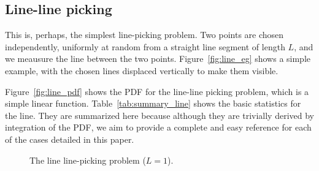 \subsection{Line-line picking}
\label{sec:line_line}

This is, perhaps, the simplest line-picking problem. Two points are
chosen independently, uniformly at random from a straight line segment
of length $L$, and we meausure the line between the two
points. Figure~\ref{fig:line_eg} shows a simple example, with the
chosen lines displaced vertically to make them visible.

Figure~\ref{fig:line_pdf} shows the PDF for the line-line
picking problem, which is a simple linear
function. Table~\ref{tab:summary_line} shows the basic statistics for
the line. They are summarized here because although they are trivially
derived by integration of the PDF, we aim to provide a complete and
easy reference for each of the cases detailed in this paper.

\begin{figure}[htbp]
  \begin{center}
       \hspace{0.04\columnwidth}
    \caption{The line line-picking problem ($L=1$).}
  \end{center}
\vspace{-4mm}
\end{figure}

